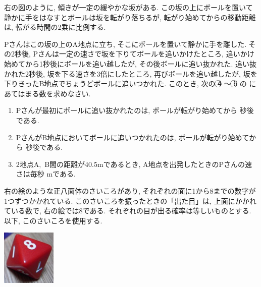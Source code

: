 \documentclass[dvipdfmx, titlepage, 11pt]{jsarticle}
\newcommand{\ncircle}[1]{\textcircled{\scriptsize #1}}
\newcommand{\nbox}[1]{\fbox{\hspace{5pt} \textcircled{\scriptsize #1}\hspace{5pt} }}
\newcommand{\ebox}{\fbox{　\hspace{10pt} }}
\begin{document}
\newpage

\begin{multicols}{2}
  \noindent {}\hspace{10pt} 右の図のように, 傾きが一定の緩やかな坂がある. この坂の上にボールを置いて静かに手をはなすとボールは坂を転がり落ちるが, 転がり始めてからの移動距離は, 転がる時間の2乗に比例する.\\[2cm]
  \begin{center}
  \end{center}
\end{multicols}
Pさんはこの坂の上のA地点に立ち, そこにボールを置いて静かに手を離した. その2秒後, Pさんは一定の速さで坂を下りてボールを追いかけたところ, 追いかけ始めてから1秒後にボールを追い越したが, その後ボールに追い抜かれた. 追い抜かれた2秒後, 坂を下る速さを3倍にしたところ, 再びボールを追い越したが, 坂を下りきったB地点でちょうどボールに追いつかれた. このとき, 次の \ncircle{4} 〜 \ncircle{6} の \ebox にあてはまる数を求めなさい.
\begin{enumerate}[(1)]
\item Pさんが最初にボールに追い抜かれたのは, ボールが転がり始めてから \nbox{4} 秒後である.\\[3cm]
\item PさんがB地点においてボールに追いつかれたのは, ボールが転がり始めてから \nbox{5} 秒後である.\\[3cm]
\item 2地点A,\ B間の距離が40.5mであるとき, A地点を出発したときのPさんの速さは毎秒 \nbox{6} mである.
\end{enumerate}
\newpage

\begin{minipage}{0.7\hsize}
  \noindent {}\hspace{10pt} 右の絵のような正八面体のさいころがあり, それぞれの面に1から8までの数字が1つずつかかれている. このさいころを振ったときの「出た目」は, 上面にかかれている数で, 右の絵では8である. それぞれの目が出る確率は等しいものとする. 以下, このさいころを使用する.
\end{minipage}
\begin{minipage}{0.26\hsize}
  \begin{center}
    \includegraphics[width=2.6cm]{sai.png}
  \end{center}
\end{minipage}
\end{document}
